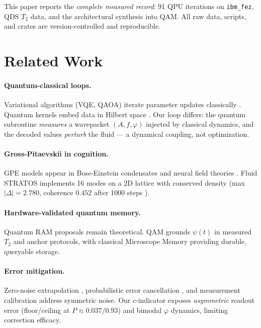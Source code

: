 \documentclass[sigconf,anonymous=false]{acmart}
\begin{document}
This paper reports the \emph{complete measured record}: 91 QPU iterations on \texttt{ibm\_fez}, QDS $T_2$ data, and the architectural synthesis into QAM. All raw data, scripts, and crates are version-controlled and reproducible.

\section{Related Work}

\paragraph{Quantum-classical loops.} Variational algorithms (VQE, QAOA) iterate parameter updates classically \cite{Peruzzo2014, Farhi2014}. Quantum kernels embed data in Hilbert space \cite{Havlicek2019}. Our loop differs: the quantum subroutine \emph{measures} a wavepacket $(A,f,\varphi)$ injected by classical dynamics, and the decoded values \emph{perturb} the fluid --- a dynamical coupling, not optimization.

\paragraph{Gross-Pitaevskii in cognition.} GPE models appear in Bose-Einstein condensates \cite{Pitaevskii2003} and neural field theories \cite{Coombes2005}. Fluid STRATOS implements 16 modes on a 2D lattice with conserved density (max $|\Delta| = 2.780$, coherence $0.452$ after 1000 steps \cite{QOI-gpe}).

\paragraph{Hardware-validated quantum memory.} Quantum RAM proposals \cite{Giovannetti2008} remain theoretical. QAM grounds $\psi(t)$ in measured $T_2$ and anchor protocols, with classical Microscope Memory providing durable, queryable storage.

\paragraph{Error mitigation.} Zero-noise extrapolation \cite{Temme2017}, probabilistic error cancellation \cite{Endo2018}, and measurement calibration \cite{Nation2019} address symmetric noise. Our $c$-indicator exposes \emph{asymmetric} readout error (floor/ceiling at $P\approx 0.037/0.93$) and bimodal $\varphi$ dynamics, limiting correction efficacy.
\end{document}
